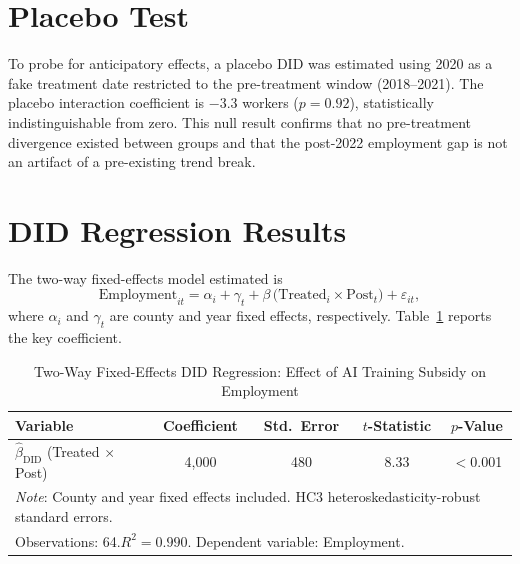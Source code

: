 \documentclass[12pt]{article}
\begin{document}
\section*{Placebo Test}

To probe for anticipatory effects, a placebo DID was estimated using
2020 as a fake treatment date restricted to the pre-treatment window
(2018--2021).  The placebo interaction coefficient is $-3.3$ workers
($p = 0.92$), statistically indistinguishable from zero.  This null
result confirms that no pre-treatment divergence existed between groups
and that the post-2022 employment gap is not an artifact of a
pre-existing trend break.

\section*{DID Regression Results}

The two-way fixed-effects model estimated is
\begin{equation}
  \text{Employment}_{it}
  = \alpha_i + \gamma_t
    + \beta\,\bigl(\text{Treated}_i \times \text{Post}_{t}\bigr)
    + \varepsilon_{it},
\end{equation}
where $\alpha_i$ and $\gamma_t$ are county and year fixed effects,
respectively.  Table~\ref{tab:did} reports the key coefficient.

\begin{table}[h]
  \centering
  \caption{Two-Way Fixed-Effects DID Regression: Effect of AI Training
    Subsidy on Employment}
  \begin{tabular}{lcccc}
    \hline\hline
    Variable
      & Coefficient
      & Std.\ Error
      & $t$-Statistic
      & $p$-Value \\
    \hline
    $\hat{\beta}_{\mathrm{DID}}$
    (Treated $\times$ Post)
      & 4{,}000
      & 480
      & 8.33
      & $<$0.001 \\
    \hline
    \multicolumn{5}{l}{%
      \small\textit{Note}: County and year fixed effects included.
      HC3 heteroskedasticity-robust standard errors.} \\
    \multicolumn{5}{l}{%
      \small Observations: 64.\quad $R^{2} = 0.990$.\quad
      Dependent variable: Employment.} \\
    \hline\hline
  \end{tabular}
  \label{tab:did}
\end{table}
\end{document}
